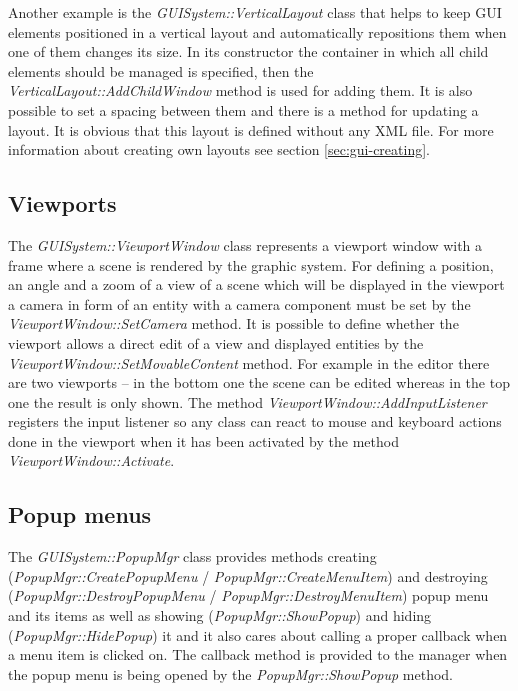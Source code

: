 Another example is the \emph{GUISystem::VerticalLayout} class that helps to keep GUI elements positioned in a vertical layout and automatically repositions them when one of them changes its size. In its constructor the container in which all child elements should be managed is specified, then the \emph{VerticalLayout::AddChildWindow} method is used for adding them. It is also possible to set a spacing between them and there is a method for updating a layout. It is obvious that this layout is defined without any XML file. For more information about creating own layouts see section \ref{sec:gui-creating}.

\subsection{Viewports}

The \emph{GUISystem::ViewportWindow} class represents a viewport window with a frame where a scene is rendered by the graphic system. For defining a position, an angle and a zoom of a view of a scene which will be displayed in the viewport a camera in form of an entity with a camera component must be set by the \emph{ViewportWindow::SetCamera} method. It is possible to define whether the viewport allows a direct edit of a view and displayed entities by the \emph{ViewportWindow::SetMovableContent} method. For example in the editor there are two viewports -- in the bottom one the scene can be edited whereas in the top one the result is only shown. The method \emph{ViewportWindow::AddInputListener} registers the input listener so any class can react to mouse and keyboard actions done in the viewport when it has been activated by the method \emph{ViewportWindow::Activate}.

\subsection{Popup menus}

The \emph{GUISystem::PopupMgr} class provides methods creating (\emph{Popup\-Mgr\-::\-Create\-Popup\-Menu} / \emph{PopupMgr::CreateMenuItem}) and destroying (\emph{PopupMgr::DestroyPopupMenu} / \emph{PopupMgr::DestroyMenuItem}) popup menu and its items as well as showing (\emph{PopupMgr::ShowPopup}) and hiding (\emph{PopupMgr::HidePopup}) it and it also cares about calling a proper callback when a menu item is clicked on. The callback method is provided to the manager when the popup menu is being opened by the \emph{PopupMgr::ShowPopup} method.

